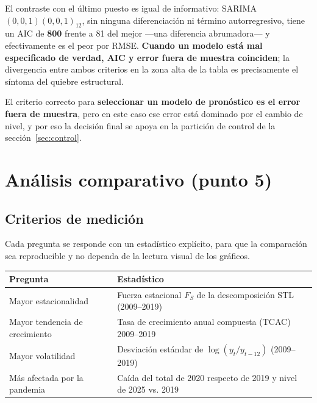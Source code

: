 \documentclass[12pt,letterpaper]{article}
\newcommand{\seccion}[1]{\section{#1}}
\newcommand{\subseccion}[1]{\subsection{#1}}
\begin{document}
El contraste con el último puesto es igual de informativo: SARIMA$(0,0,1)(0,0,1)_{12}$, sin
ninguna diferenciación ni término autorregresivo, tiene un AIC de \textbf{800} frente a 81 del
mejor ---una diferencia abrumadora--- y efectivamente es el peor por RMSE. \textbf{Cuando un
modelo está mal especificado de verdad, AIC y error fuera de muestra coinciden}; la divergencia
entre ambos criterios en la zona alta de la tabla es precisamente el síntoma del quiebre
estructural.

El criterio correcto para \textbf{seleccionar un modelo de pronóstico es el error fuera de
muestra}, pero en este caso ese error está dominado por el cambio de nivel, y por eso la
decisión final se apoya en la partición de control de la sección~\ref{sec:control}.

\seccion{Análisis comparativo (punto 5)}

\subseccion{Criterios de medición}

Cada pregunta se responde con un estadístico explícito, para que la comparación sea reproducible
y no dependa de la lectura visual de los gráficos.

\begin{table}[H]
\centering
\small
\begin{tabularx}{\textwidth}{lX}
\toprule
\textbf{Pregunta} & \textbf{Estadístico} \\
\midrule
Mayor estacionalidad & Fuerza estacional $F_S$ de la descomposición STL (2009--2019) \\
Mayor tendencia de crecimiento & Tasa de crecimiento anual compuesta (TCAC) 2009--2019 \\
Mayor volatilidad & Desviación estándar de $\log(y_t / y_{t-12})$ (2009--2019) \\
Más afectada por la pandemia & Caída del total de 2020 respecto de 2019 y nivel de 2025 vs. 2019 \\
\bottomrule
\end{tabularx}
\end{table}
\end{document}
